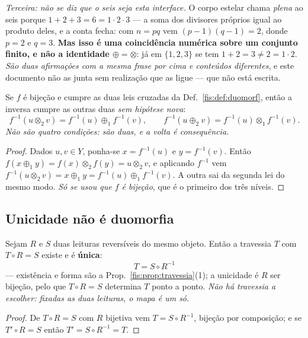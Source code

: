 \documentclass[livro.tex]{subfiles}
\begin{document}
\emph{Terceira: não se diz que o seis seja esta interface.} O corpo estelar
chama \emph{plena} ao seis porque $1+2+3=6=1\cdot2\cdot3$ --- a soma dos
divisores próprios igual ao produto deles, e a conta fecha: com $n=pq$ vem
$(p-1)(q-1)=2$, donde $p=2$ e $q=3$. \textbf{Mas isso é uma coincidência
numérica sobre um conjunto finito, e não a identidade $\oplus=\otimes$}: já em
$\{1,2,3\}$ se tem $1+2=3\neq2=1\cdot2$. \emph{São duas afirmações com a mesma
frase por cima e conteúdos diferentes}, e este documento não as junta sem
realização que as ligue --- que não está escrita.

\begin{lema}\label{fis:lem:quatro}
Se $f$ é bijeção e cumpre as duas leis cruzadas da Def.~\ref{fis:def:duomorf},
então a inversa cumpre as outras duas \emph{sem hipótese nova}:
\[
f^{-1}(u\otimes_2 v)=f^{-1}(u)\oplus_1 f^{-1}(v),
\qquad
f^{-1}(u\oplus_2 v)=f^{-1}(u)\otimes_1 f^{-1}(v).
\]
\emph{Não são quatro condições: são duas, e a volta é consequência.}
\end{lema}

\begin{proof}
Dados $u,v\in Y$, ponha-se $x=f^{-1}(u)$ e $y=f^{-1}(v)$. Então
$f(x\oplus_1 y)=f(x)\otimes_2 f(y)=u\otimes_2 v$, e aplicando $f^{-1}$ vem
$f^{-1}(u\otimes_2 v)=x\oplus_1 y=f^{-1}(u)\oplus_1 f^{-1}(v)$. A outra sai da
segunda lei do mesmo modo. \emph{Só se usou que $f$ é bijeção}, que é o primeiro
dos três níveis.
\end{proof}

\subsection*{Unicidade não é duomorfia}

\begin{corolario}\label{fis:cor:travunica}
Sejam $R$ e $S$ duas leituras reversíveis do mesmo objeto. Então a travessia $T$
com $T\circ R=S$ existe e é \textbf{única}:
\[
\boxed{\;T=S\circ R^{-1}\;}
\]
--- existência e forma são a Prop.~\ref{fis:prop:travessia}(1); a unicidade é $R$
ser bijeção, pelo que $T\circ R=S$ determina $T$ ponto a ponto. \emph{Não há
travessia a escolher: fixadas as duas leituras, o mapa é um só.}
\end{corolario}

\begin{proof}
De $T\circ R=S$ com $R$ bijetiva vem $T=S\circ R^{-1}$, bijeção por composição; e
se $T'\circ R=S$ então $T'=S\circ R^{-1}=T$.
\end{proof}
\end{document}

